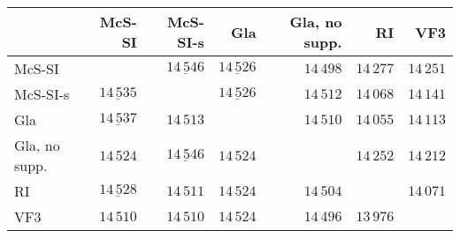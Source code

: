 
\begin{tabular}{lrrrrrr}
    \toprule

 & McS-SI & McS-SI-s & Gla & Gla, no supp. & RI & VF3 \\

    \midrule

McS-SI &  & $\underline{14\,546}$ & $\underline{14\,526}$ & $14\,498$ & $14\,277$ & $14\,251$ \\
McS-SI-s & $\underline{14\,535}$ &  & $\underline{14\,526}$ & $14\,512$ & $14\,068$ & $14\,141$ \\
Gla & $\underline{14\,537}$ & $14\,513$ &  & $14\,510$ & $14\,055$ & $14\,113$ \\
Gla, no supp. & $14\,524$ & $\underline{14\,546}$ & $14\,524$ &  & $14\,252$ & $14\,212$ \\
RI & $\underline{14\,528}$ & $14\,511$ & $14\,524$ & $14\,504$ &  & $14\,071$ \\
VF3 & $14\,510$ & $14\,510$ & $14\,524$ & $14\,496$ & $13\,976$ &  \\

    \bottomrule
\end{tabular}


